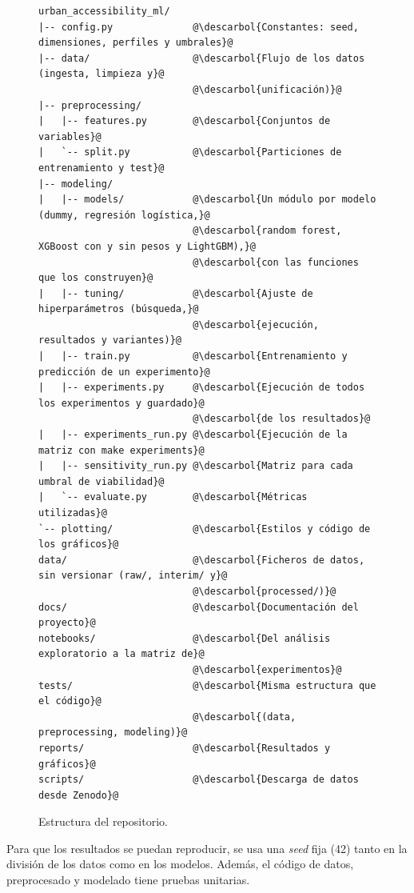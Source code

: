 \begin{figure}[H]
\begin{lstlisting}[style=tfmarbol]
urban_accessibility_ml/
|-- config.py              @\descarbol{Constantes: seed, dimensiones, perfiles y umbrales}@
|-- data/                  @\descarbol{Flujo de los datos (ingesta, limpieza y}@
                           @\descarbol{unificación)}@
|-- preprocessing/
|   |-- features.py        @\descarbol{Conjuntos de variables}@
|   `-- split.py           @\descarbol{Particiones de entrenamiento y test}@
|-- modeling/
|   |-- models/            @\descarbol{Un módulo por modelo (dummy, regresión logística,}@
                           @\descarbol{random forest, XGBoost con y sin pesos y LightGBM),}@
                           @\descarbol{con las funciones que los construyen}@
|   |-- tuning/            @\descarbol{Ajuste de hiperparámetros (búsqueda,}@
                           @\descarbol{ejecución, resultados y variantes)}@
|   |-- train.py           @\descarbol{Entrenamiento y predicción de un experimento}@
|   |-- experiments.py     @\descarbol{Ejecución de todos los experimentos y guardado}@
                           @\descarbol{de los resultados}@
|   |-- experiments_run.py @\descarbol{Ejecución de la matriz con make experiments}@
|   |-- sensitivity_run.py @\descarbol{Matriz para cada umbral de viabilidad}@
|   `-- evaluate.py        @\descarbol{Métricas utilizadas}@
`-- plotting/              @\descarbol{Estilos y código de los gráficos}@
data/                      @\descarbol{Ficheros de datos, sin versionar (raw/, interim/ y}@
                           @\descarbol{processed/)}@
docs/                      @\descarbol{Documentación del proyecto}@
notebooks/                 @\descarbol{Del análisis exploratorio a la matriz de}@
                           @\descarbol{experimentos}@
tests/                     @\descarbol{Misma estructura que el código}@
                           @\descarbol{(data, preprocessing, modeling)}@
reports/                   @\descarbol{Resultados y gráficos}@
scripts/                   @\descarbol{Descarga de datos desde Zenodo}@
\end{lstlisting}
\caption{Estructura del repositorio.}\label{fig:estructura-repositorio}
\end{figure}

Para que los resultados se puedan reproducir, se usa una \textit{seed} fija (42) tanto en la división de los datos como en los modelos. Además, el código de datos, preprocesado y modelado tiene pruebas unitarias.
\\

